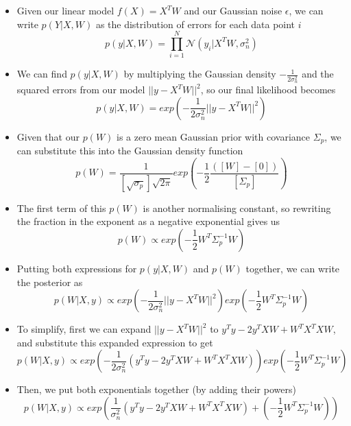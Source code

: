 \documentclass[12pt]{article}
\begin{document}
\begin{itemize}
    \item Given our linear model $f(X) = X^TW$ and our Gaussian noise $\epsilon$, we can write $p(Y|X,W)$ as the distribution of errors for each data point $i$
 \begin{equation}
     p(y|X,W) = \prod_{i=1}^N \mathcal{N}(y_i|X^TW, \sigma^2_n)
 \end{equation}
     \item We can find $p(y|X,W)$ by multiplying the Gaussian density $-\frac{1}{2\sigma^2_n}$ and the squared errors from our model $||y -X^TW||^2$, so our final likelihood becomes
 \begin{equation}
     p(y|X,W) = exp\left(-\frac{1}{2\sigma^2_n}||y -X^TW||^2\right)
 \end{equation}
     \item Given that our $p(W)$ is a zero mean Gaussian prior with covariance $\Sigma_p$, we can substitute this into the Gaussian density function
 \begin{equation}
     p(W) = \frac{1}{[\sqrt{\sigma_p}]\sqrt{2\pi}} exp\left(-\frac{1}{2}\frac{([W]-[0])}{[\Sigma_p]}\right)
 \end{equation}
     \item The first term of this $p(W)$ is another normalising constant, so rewriting the fraction in the exponent as a negative exponential gives us
 \begin{equation}
     p(W) \propto exp\left(-\frac{1}{2}W^T\Sigma_p^{-1}W\right)
 \end{equation}
     \item Putting both expressions for $p(y|X,W)$ and $p(W)$ together, we can write the posterior as
 \begin{equation}
     p(W|X,y) \propto exp\left(-\frac{1}{2\sigma^2_n}||y -X^TW||^2\right)exp\left(-\frac{1}{2}W^T\Sigma_p^{-1}W\right)
 \end{equation}
     \item To simplify, first we can expand $||y - X^TW||^2$ to $y^Ty - 2y^TXW + W^TX^TXW$, and substitute this expanded expression to get
 \begin{equation}
     p(W|X,y) \propto exp\left(-\frac{1}{2\sigma^2_n}(y^Ty - 2y^TXW + W^TX^TXW)\right)exp\left(-\frac{1}{2}W^T\Sigma_p^{-1}W\right)
 \end{equation}
     \item Then, we put both exponentials together (by adding their powers)
 \begin{equation}
     p(W|X,y) \propto exp\left(\frac{1}{\sigma^2_n}(y^Ty - 2y^TXW + W^TX^TXW) + \left(-\frac{1}{2}W^T\Sigma_p^{-1}W\right)\right)

\end{equation}
\end{itemize}
\end{document}
